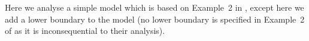Here we analyse a simple model which is based on Example~2 in \cite{bean2009}, except here we add a lower boundary to the model (no lower boundary is specified in Example~2 of \cite{bean2009} as it is inconsequential to their analysis). 




